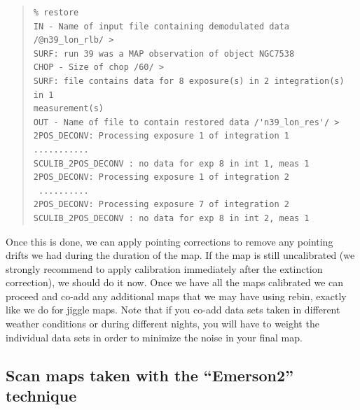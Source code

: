 \documentclass[twoside,11pt]{article}
\newenvironment{myquote}{\begin{quote}\begin{small}}{\end{small}\end{quote}}
\newcommand{\task}[1]{\textsf{#1}}
\newcommand{\rebin}{\xref{\task{rebin}}{sun216}{REBIN}}
\newcommand{\xref}[3]{#1}
\newcommand{\xlabel}[1]{}
\renewcommand{\_}{\texttt{\symbol{95}}}
\begin{document}
\begin{myquote}
\begin{verbatim}
% restore
IN - Name of input file containing demodulated data /@n39_lon_rlb/ >
SURF: run 39 was a MAP observation of object NGC7538
CHOP - Size of chop /60/ > 
SURF: file contains data for 8 exposure(s) in 2 integration(s) in 1
measurement(s)
OUT - Name of file to contain restored data /'n39_lon_res'/ >
2POS_DECONV: Processing exposure 1 of integration 1
...........
SCULIB_2POS_DECONV : no data for exp 8 in int 1, meas 1
2POS_DECONV: Processing exposure 1 of integration 2
 ..........
2POS_DECONV: Processing exposure 7 of integration 2
SCULIB_2POS_DECONV : no data for exp 8 in int 2, meas 1
\end{verbatim}
\end{myquote}

Once this is done, we can apply pointing corrections to remove any
pointing drifts we had during the duration of the map.  If the map is
still uncalibrated (we strongly recommend to apply calibration
immediately after the extinction correction), we should do it now. 
Once we have all the maps calibrated we can proceed and co-add any
additional maps that we may have using \rebin, exactly like we do for
jiggle maps.  Note that if you co-add data sets taken in different
weather conditions or during different nights, you will have to weight
the individual data sets in order to minimize the noise in your final
map.


\subsection{\xlabel{Emerson2_maps}Scan maps taken with the 
``Emerson2''
technique}
\end{document}
